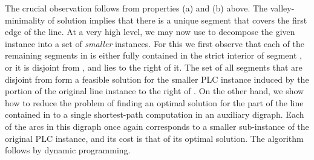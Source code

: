 \documentclass[11pt]{article}
\newcommand{\1}{\mathbb{1}}
\begin{document}
The crucial observation follows from properties (a) and (b) above.
The valley-minimality of solution  implies that there is a unique
segment  that covers the first edge of the line. At a very
high level, we may now use  to decompose the given instance into a
set of {\em smaller} instances.  For this we first observe that each
of the remaining segments in  is either fully
contained in the strict interior of segment , or it is disjoint
from , and lies to the right of it.  The set of all segments that
are disjoint from  form a feasible solution for the smaller PLC
instance induced by the portion of the original line instance to the
right of . On the other hand, we show how to reduce the problem of
finding an optimal solution for the part of the line contained in 
to a single shortest-path computation in an auxiliary digraph.  Each
of the arcs in this digraph once again corresponds to a smaller
sub-instance of the original PLC instance, and its cost is that of its
optimal solution. The algorithm follows by dynamic programming.
\end{document}
